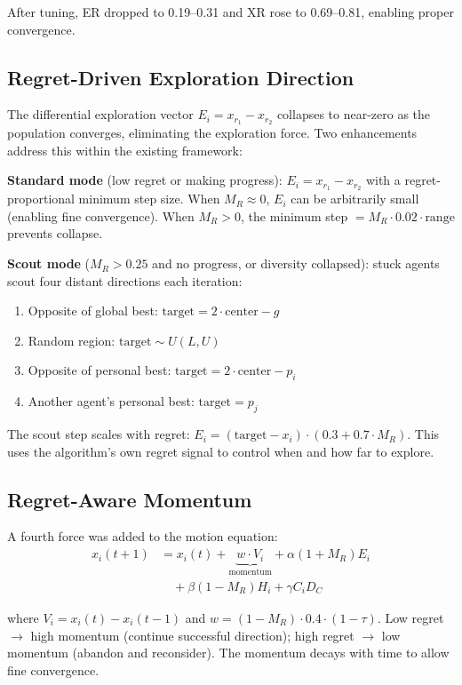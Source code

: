 \documentclass[10pt,twocolumn]{article}
\begin{document}
After tuning, ER dropped to 0.19--0.31 and XR rose to 0.69--0.81, enabling proper convergence.

\subsection{Regret-Driven Exploration Direction}

The differential exploration vector $E_i = x_{r_1} - x_{r_2}$ collapses to near-zero as the population converges, eliminating the exploration force. Two enhancements address this within the existing framework:

\textbf{Standard mode} (low regret or making progress): $E_i = x_{r_1} - x_{r_2}$ with a regret-proportional minimum step size. When $M_R \approx 0$, $E_i$ can be arbitrarily small (enabling fine convergence). When $M_R > 0$, the minimum step $= M_R \cdot 0.02 \cdot \text{range}$ prevents collapse.

\textbf{Scout mode} ($M_R > 0.25$ and no progress, or diversity collapsed): stuck agents scout four distant directions each iteration:
\begin{enumerate}[nosep]
\item Opposite of global best: $\text{target} = 2 \cdot \text{center} - g$
\item Random region: $\text{target} \sim U(L, U)$
\item Opposite of personal best: $\text{target} = 2 \cdot \text{center} - p_i$
\item Another agent's personal best: $\text{target} = p_j$
\end{enumerate}

The scout step scales with regret: $E_i = (\text{target} - x_i) \cdot (0.3 + 0.7 \cdot M_R)$. This uses the algorithm's own regret signal to control when and how far to explore.

\subsection{Regret-Aware Momentum}

A fourth force was added to the motion equation:
\begin{align}
x_i(t+1) &= x_i(t) + \underbrace{w \cdot V_i}_{\text{momentum}} + \alpha(1+M_R) E_i \nonumber \\
&\quad + \beta(1-M_R) H_i + \gamma C_i D_C
\end{align}

where $V_i = x_i(t) - x_i(t-1)$ and $w = (1 - M_R) \cdot 0.4 \cdot (1 - \tau)$. Low regret $\to$ high momentum (continue successful direction); high regret $\to$ low momentum (abandon and reconsider). The momentum decays with time to allow fine convergence.
\end{document}

